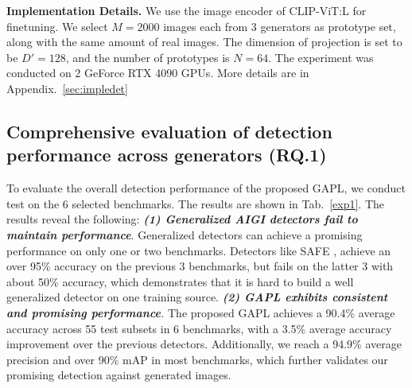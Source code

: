     
\textbf{Implementation Details.}
    We use the image encoder of CLIP-ViT:L \cite{CLIP, dosovitskiy2020vit} for finetuning. We select $M=2000$ images each from 3 generators as prototype set, along with the same amount of real images. The dimension of projection is set to be $D'=128$, and the number of prototypes is $N=64$.  The experiment was conducted on 2 GeForce RTX 4090 GPUs. More details are in Appendix.~\ref{sec:impledet}

\subsection{Comprehensive evaluation of detection performance across generators (RQ.1)}
    To evaluate the overall detection performance of the proposed GAPL, we conduct test on the 6 selected benchmarks. The results are shown in Tab.~\ref{exp1}. The results reveal the following: \textit{\textbf{(1) Generalized AIGI detectors fail to maintain performance}}. Generalized detectors can achieve a promising performance on only one or two benchmarks. Detectors like SAFE \cite{li2025improving}, achieve an over 95\% accuracy on the previous 3 benchmarks, but fails on the latter 3 with about 50\% accuracy, which demonstrates that it is hard to build a well generalized detector on one training source. \textit{\textbf{(2) GAPL exhibits consistent and promising performance}.} The proposed GAPL achieves a 90.4\% average accuracy across 55 test subsets in 6 benchmarks, with a 3.5\% average accuracy improvement over the previous detectors. Additionally, we reach a 94.9\% average precision and over 90\% mAP in most benchmarks, which further validates our promising detection against generated images. 

